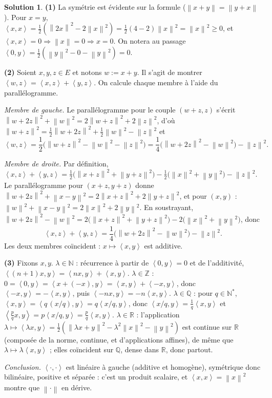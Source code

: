 \documentclass[11pt,a4paper]{article}
\newcommand{\R}{\mathbb{R}}
\newcommand{\N}{\mathbb{N}}
\newcommand{\Z}{\mathbb{Z}}
\newcommand{\Q}{\mathbb{Q}}
\newcommand{\norm}[1]{\left\|#1\right\|}
\newcommand{\ps}[2]{\left\langle #1,#2\right\rangle}
\theoremstyle{definition}
\newtheorem*{solution}{Solution}
\begin{document}
\begin{solution}
\noindent\textbf{(1)} La symétrie est évidente sur la formule ($\norm{x+y}=\norm{y+x}$). Pour $x=y$, $\ps xx=\frac12(\norm{2x}^2-2\norm x^2)=\frac12(4-2)\norm x^2=\norm x^2\ge0$, et $\ps xx=0\Rightarrow\norm x=0\Rightarrow x=0$. On notera au passage $\ps0y=\frac12(\norm y^2-0-\norm y^2)=0$.

\medskip
\noindent\textbf{(2)} Soient $x,y,z\in E$ et notons $w:=x+y$. Il s'agit de montrer $\ps wz=\ps xz+\ps yz$. On calcule chaque membre à l'aide du parallélogramme.

\emph{Membre de gauche.} Le parallélogramme pour le couple $(w+z,z)$ s'écrit $\norm{w+2z}^2+\norm w^2=2\norm{w+z}^2+2\norm z^2$, d'où $\norm{w+z}^2=\frac12\norm{w+2z}^2+\frac12\norm w^2-\norm z^2$ et
\[
\ps wz=\frac12\big(\norm{w+z}^2-\norm w^2-\norm z^2\big)=\frac14\big(\norm{w+2z}^2-\norm w^2\big)-\norm z^2 .
\]

\emph{Membre de droite.} Par définition, $\ps xz+\ps yz=\frac12\big(\norm{x+z}^2+\norm{y+z}^2\big)-\frac12\big(\norm x^2+\norm y^2\big)-\norm z^2$. Le parallélogramme pour $(x+z,y+z)$ donne $\norm{w+2z}^2+\norm{x-y}^2=2\norm{x+z}^2+2\norm{y+z}^2$, et pour $(x,y)$ : $\norm w^2+\norm{x-y}^2=2\norm x^2+2\norm y^2$. En soustrayant, $\norm{w+2z}^2-\norm w^2=2\big(\norm{x+z}^2+\norm{y+z}^2\big)-2\big(\norm x^2+\norm y^2\big)$, donc
\[
\ps xz+\ps yz=\frac14\big(\norm{w+2z}^2-\norm w^2\big)-\norm z^2 .
\]
Les deux membres coïncident : $x\mapsto\ps xy$ est additive.

\medskip
\noindent\textbf{(3)} Fixons $x,y$. \emph{$\lambda\in\N$} : récurrence à partir de $\ps0y=0$ et de l'additivité, $\ps{(n+1)x}y=\ps{nx}y+\ps xy$. \emph{$\lambda\in\Z$} : $0=\ps0y=\ps{x+(-x)}y=\ps xy+\ps{-x}y$, donc $\ps{-x}y=-\ps xy$, puis $\ps{-nx}y=-n\ps xy$. \emph{$\lambda\in\Q$} : pour $q\in\N^*$, $\ps xy=\ps{q\,(x/q)}y=q\ps{x/q}y$, donc $\ps{x/q}y=\frac1q\ps xy$ et $\ps{\frac pq x}y=p\ps{x/q}y=\frac pq\ps xy$. \emph{$\lambda\in\R$} : l'application $\lambda\mapsto\ps{\lambda x}y=\frac12(\norm{\lambda x+y}^2-\lambda^2\norm x^2-\norm y^2)$ est continue sur $\R$ (composée de la norme, continue, et d'applications affines), de même que $\lambda\mapsto\lambda\ps xy$ ; elles coïncident sur $\Q$, dense dans $\R$, donc partout.

\emph{Conclusion.} $\ps\cdot\cdot$ est linéaire à gauche (additive et homogène), symétrique donc bilinéaire, positive et séparée : c'est un produit scalaire, et $\ps xx=\norm x^2$ montre que $\norm\cdot$ en dérive.
\end{solution}
\end{document}
